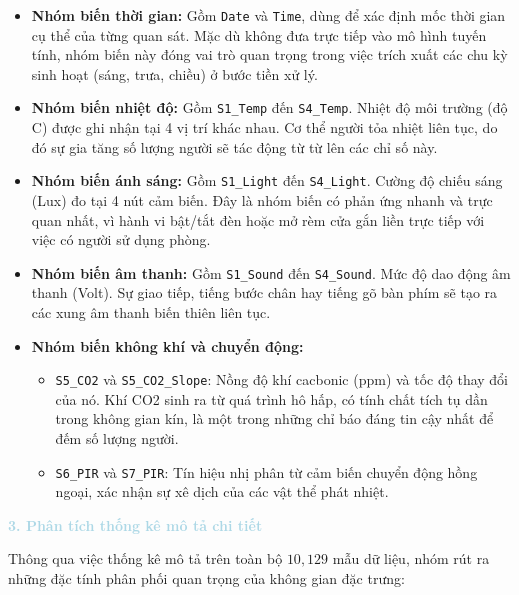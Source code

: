 \begin{itemize} [labelsep=10pt, leftmargin=2cm]
    \item \textbf{Nhóm biến thời gian:} Gồm \texttt{Date} và \texttt{Time}, dùng để xác định mốc thời gian cụ thể của từng quan sát. Mặc dù không đưa trực tiếp vào mô hình tuyến tính, nhóm biến này đóng vai trò quan trọng trong việc trích xuất các chu kỳ sinh hoạt (sáng, trưa, chiều) ở bước tiền xử lý.
    
    \item \textbf{Nhóm biến nhiệt độ:} Gồm \texttt{S1\_Temp} đến \texttt{S4\_Temp}. Nhiệt độ môi trường (độ C) được ghi nhận tại 4 vị trí khác nhau. Cơ thể người tỏa nhiệt liên tục, do đó sự gia tăng số lượng người sẽ tác động từ từ lên các chỉ số này.
    
    \item \textbf{Nhóm biến ánh sáng:} Gồm \texttt{S1\_Light} đến \texttt{S4\_Light}. Cường độ chiếu sáng (Lux) đo tại 4 nút cảm biến. Đây là nhóm biến có phản ứng nhanh và trực quan nhất, vì hành vi bật/tắt đèn hoặc mở rèm cửa gắn liền trực tiếp với việc có người sử dụng phòng.
    
    \item \textbf{Nhóm biến âm thanh:} Gồm \texttt{S1\_Sound} đến \texttt{S4\_Sound}. Mức độ dao động âm thanh (Volt). Sự giao tiếp, tiếng bước chân hay tiếng gõ bàn phím sẽ tạo ra các xung âm thanh biến thiên liên tục.
    
    \item \textbf{Nhóm biến không khí và chuyển động:} 
    \begin{itemize}
        \item \texttt{S5\_CO2} và \texttt{S5\_CO2\_Slope}: Nồng độ khí cacbonic (ppm) và tốc độ thay đổi của nó. Khí CO2 sinh ra từ quá trình hô hấp, có tính chất tích tụ dần trong không gian kín, là một trong những chỉ báo đáng tin cậy nhất để đếm số lượng người.
        \item \texttt{S6\_PIR} và \texttt{S7\_PIR}: Tín hiệu nhị phân từ cảm biến chuyển động hồng ngoại, xác nhận sự xê dịch của các vật thể phát nhiệt.
    \end{itemize}
\end{itemize}

\vspace{0.5em}
\noindent\textcolor{lightblue}{\textbf{3. Phân tích thống kê mô tả chi tiết}}
\vspace{0.5em}

Thông qua việc thống kê mô tả trên toàn bộ $10{,}129$ mẫu dữ liệu, nhóm rút ra những đặc tính phân phối quan trọng của không gian đặc trưng:

